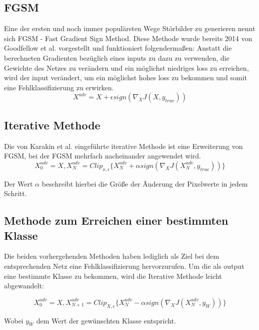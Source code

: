 \subsection{FGSM}
Eine der ersten und noch immer populärsten Wege Störbilder zu generieren nennt sich FGSM - Fast Gradient Sign Method. Diese Methode wurde bereits 2014 von Goodfellow et al. vorgestellt und funktioniert folgendermaßen:
Anstatt die berechneten Gradienten bezüglich eines inputs zu dazu zu verwenden, die Gewichte des Netzes zu verändern und ein möglichst niedriges loss zu erreichen, wird der input verändert, um ein möglichst hohes loss zu bekommen und somit eine Fehlklassifizierung zu erwirken.
\begin{equation}
X^{adv} = X + \epsilon sign(\nabla_{X} J(X, y_{true}))
\end{equation}


\subsection{Iterative Methode}
Die von Karakin et al. eingeführte iterative Methode ist eine Erweiterung von FGSM, bei der FGSM mehrfach nacheinander angewendet wird.
\begin{equation}
X_0^{adv} = X, X_N^{adv} = Clip_{x, \epsilon} \{X_N^{adv} +\alpha sign(\nabla_X J(X_N^{adv}, y_{true})) \}
\end{equation}

Der Wert \(\alpha\) beschreibt hierbei die Größe der Änderung der Pixelwerte in jedem Schritt. 

\subsection{Methode zum Erreichen einer bestimmten Klasse}

Die beiden vorhergehenden Methoden haben lediglich als Ziel bei dem entsprechenden Netz eine Fehlklassifizierung hervorzurufen. Um die als output eine bestimmte Klasse zu bekommen, wird die Iterative Methode leicht abgewandelt:

\begin{equation}
X_0^{adv} = X, X_{N+1}^{adv} = Clip_{X, \epsilon} \{X_N^{adv} - \alpha sign(\nabla_X J(X_N^{adv}, y_{W})) \}
\end{equation}

Wobei \(y_W\) dem Wert der gewünschten Klasse entspricht.

